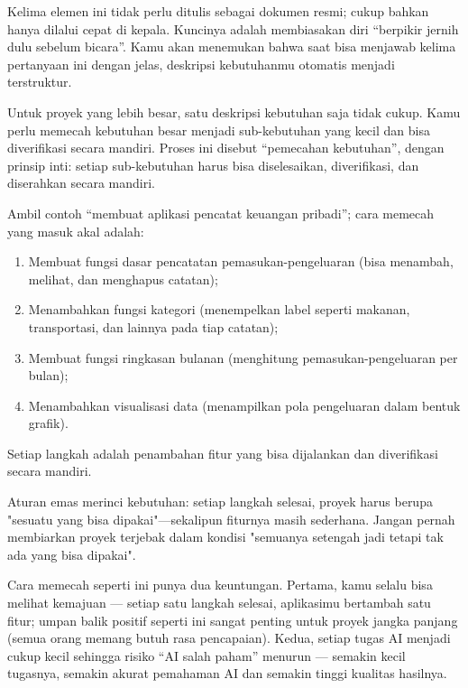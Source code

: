 Kelima elemen ini tidak perlu ditulis sebagai dokumen resmi; cukup bahkan hanya dilalui cepat di kepala. Kuncinya adalah membiasakan diri “berpikir jernih dulu sebelum bicara”. Kamu akan menemukan bahwa saat bisa menjawab kelima pertanyaan ini dengan jelas, deskripsi kebutuhanmu otomatis menjadi terstruktur.


Untuk proyek yang lebih besar, satu deskripsi kebutuhan saja tidak cukup. Kamu perlu memecah kebutuhan besar menjadi sub-kebutuhan yang kecil dan bisa diverifikasi secara mandiri. Proses ini disebut “pemecahan kebutuhan”, dengan prinsip inti: setiap sub-kebutuhan harus bisa diselesaikan, diverifikasi, dan diserahkan secara mandiri.

Ambil contoh “membuat aplikasi pencatat keuangan pribadi”; cara memecah yang masuk akal adalah:

\begin{enumerate}
  \item Membuat fungsi dasar pencatatan pemasukan-pengeluaran (bisa menambah, melihat, dan menghapus catatan);
  \item Menambahkan fungsi kategori (menempelkan label seperti makanan, transportasi, dan lainnya pada tiap catatan);
  \item Membuat fungsi ringkasan bulanan (menghitung pemasukan-pengeluaran per bulan);
  \item Menambahkan visualisasi data (menampilkan pola pengeluaran dalam bentuk grafik).
\end{enumerate}

Setiap langkah adalah penambahan fitur yang bisa dijalankan dan diverifikasi secara mandiri.

Aturan emas merinci kebutuhan: setiap langkah selesai, proyek harus berupa "sesuatu yang bisa dipakai"—sekalipun fiturnya masih sederhana. Jangan pernah membiarkan proyek terjebak dalam kondisi "semuanya setengah jadi tetapi tak ada yang bisa dipakai".

Cara memecah seperti ini punya dua keuntungan. Pertama, kamu selalu bisa melihat kemajuan — setiap satu langkah selesai, aplikasimu bertambah satu fitur; umpan balik positif seperti ini sangat penting untuk proyek jangka panjang (semua orang memang butuh rasa pencapaian). Kedua, setiap tugas AI menjadi cukup kecil sehingga risiko “AI salah paham” menurun — semakin kecil tugasnya, semakin akurat pemahaman AI dan semakin tinggi kualitas hasilnya.


